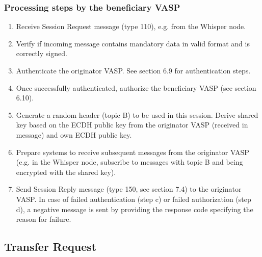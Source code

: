 \documentclass{article}
\begin{document}
\subsubsection{Processing steps by the beneficiary VASP}
\begin{enumerate}
    \item Receive Session Request message (type 110), e.g. from the Whisper node.
    \item Verify if incoming message contains mandatory data in valid format and is correctly signed.
    \item Authenticate the originator VASP. See section 6.9 for authentication steps.
    \item Once successfully authenticated, authorize the beneficiary VASP (see section 6.10).
    \item Generate a random header (topic B) to be used in this session. Derive shared key based on the ECDH public key from the originator VASP (received in message) and own ECDH public key.
    \item Prepare systems to receive subsequent messages from the originator VASP (e.g. in the Whisper node, subscribe to messages with topic B and being encrypted with the shared key).
    \item Send Session Reply message (type 150, see section 7.4) to the originator VASP. In case of failed authentication (step c) or failed authorization (step d), a negative message is sent by providing the response code specifying the reason for failure.
\end{enumerate}

\subsection{Transfer Request}
\end{document}
